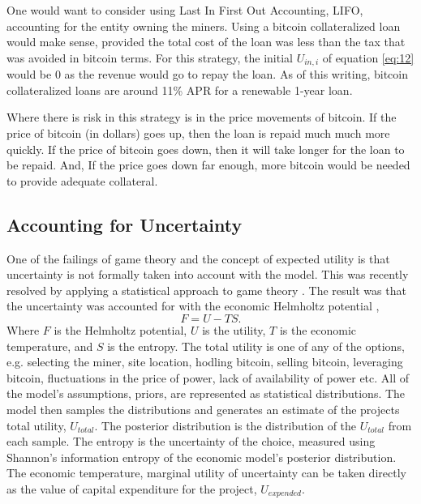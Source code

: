 \documentclass[runningheads]{llncs}
\begin{document}
One would want to consider using Last In First Out Accounting, LIFO, accounting for the entity owning the miners.
Using a bitcoin collateralized loan would make sense, provided the total cost of the loan was less than the tax that was avoided in bitcoin terms.
For this strategy, the initial $U_{in,i}$ of equation \ref{eq:12} would be 0 as the revenue would go to repay the loan.
As of this writing, bitcoin collateralized loans are around 11\% APR for a renewable 1-year loan.

Where there is risk in this strategy is in the price movements of bitcoin.
If the price of bitcoin (in dollars) goes up, then the loan is repaid much much more quickly.
If the price of bitcoin goes down, then it will take longer for the loan to be repaid.
And, If the price goes down far enough, more bitcoin would be needed to provide adequate collateral.

\subsection{Accounting for Uncertainty}
One of the failings of game theory and the concept of expected utility is that uncertainty is not formally taken into account with the model.
This was recently resolved by applying a statistical approach to game theory \cite{abel2021entropy}.
The result was that the uncertainty was accounted for with the economic Helmholtz potential \cite{abel2021entropy},
\begin{equation}
    F = U - T S. \label{eq:13}
\end{equation}
Where $F$ is the Helmholtz potential, $U$ is the utility, $T$ is the economic temperature, and $S$ is the entropy.
The total utility is one of any of the options, e.g. selecting the miner, site location, hodling bitcoin, selling bitcoin, leveraging bitcoin, fluctuations in the price of power, lack of availability of power etc.
All of the model's assumptions, priors, are represented as statistical distributions.
The model then samples the distributions and generates an estimate of the projects total utility, $U_{total}$.
The posterior distribution is the distribution of the $U_{total}$ from each sample.
The entropy is the uncertainty of the choice, measured using Shannon's information entropy of the economic model's posterior distribution.
The economic temperature, marginal utility of uncertainty can be taken directly as the value of capital expenditure for the project, $U_{expended}$.
\end{document}
